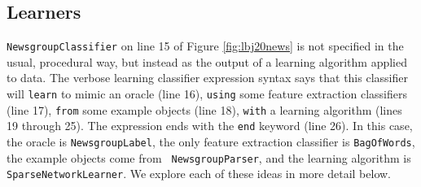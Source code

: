\subsection{Learners}

{\tt NewsgroupClassifier} on line 15 of Figure \ref{fig:lbj20news} is not
specified in the usual, procedural way, but instead as the output of a
learning algorithm applied to data.  The verbose learning classifier
expression syntax says that this classifier will {\tt learn} to mimic an
oracle (line 16), {\tt using} some feature extraction classifiers (line 17),
{\tt from} some example objects (line 18), {\tt with} a learning algorithm
(lines 19 through 25).  The expression ends with the {\tt end} keyword (line
26).  In this case, the oracle is {\tt NewsgroupLabel}, the only feature
extraction classifier is {\tt BagOfWords}, the example objects come from {\tt
NewsgroupParser}, and the learning algorithm is {\tt SparseNetworkLearner}.
We explore each of these ideas in more detail below.

